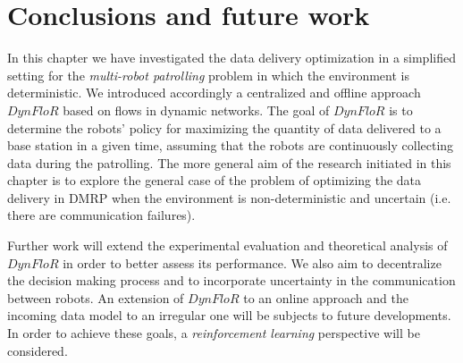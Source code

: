 \section{Conclusions and future work}\label{conc}

In this chapter we have investigated the data delivery optimization in a simplified setting  for the \emph{multi-robot patrolling} problem in which the environment is deterministic. We introduced accordingly a centralized and offline approach $DynFloR$ based on flows in dynamic networks. The goal of $DynFloR$ is to determine the robots' policy for maximizing  the quantity of data delivered to a base station in a given time, assuming that the robots are continuously collecting data during the patrolling. The more general aim of the research initiated in this chapter is to explore the general case of the problem  of optimizing the data delivery in DMRP when the environment is non-deterministic and uncertain (i.e. there are communication failures). 

Further work will extend the experimental evaluation and theoretical analysis of $DynFloR$ in order to better assess its performance. We also aim to decentralize the decision making process and to incorporate uncertainty in the communication between robots.  An extension of $DynFloR$ to an online approach and the incoming data model to an irregular one will be subjects to future developments. In order to achieve these goals, a \emph{reinforcement learning} perspective will be considered. 

